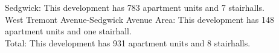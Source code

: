 {Sedgwick}: This development has 783 apartment units and 7 stairhalls.\\{West Tremont Avenue-Sedgwick Avenue Area}: This development has 148 apartment units and one stairhall.\\{Total}: This development has 931 apartment units and 8 stairhalls.\\